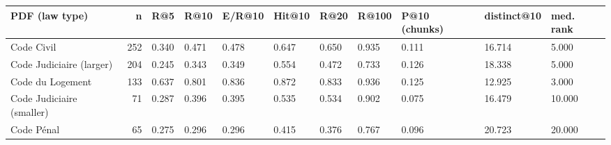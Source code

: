 \begin{tabular}{lrlllllllll}
\toprule
PDF (law type) & n & R@5 & R@10 & E/R@10 & Hit@10 & R@20 & R@100 & P@10 (chunks) & distinct@10 & med. rank \\
\midrule
Code Civil & 252 & 0.340 & 0.471 & 0.478 & 0.647 & 0.650 & 0.935 & 0.111 & 16.714 & 5.000 \\
Code Judiciaire (larger) & 204 & 0.245 & 0.343 & 0.349 & 0.554 & 0.472 & 0.733 & 0.126 & 18.338 & 5.000 \\
Code du Logement & 133 & 0.637 & 0.801 & 0.836 & 0.872 & 0.833 & 0.936 & 0.125 & 12.925 & 3.000 \\
Code Judiciaire (smaller) & 71 & 0.287 & 0.396 & 0.395 & 0.535 & 0.534 & 0.902 & 0.075 & 16.479 & 10.000 \\
Code Pénal & 65 & 0.275 & 0.296 & 0.296 & 0.415 & 0.376 & 0.767 & 0.096 & 20.723 & 20.000 \\
\bottomrule
\end{tabular}
